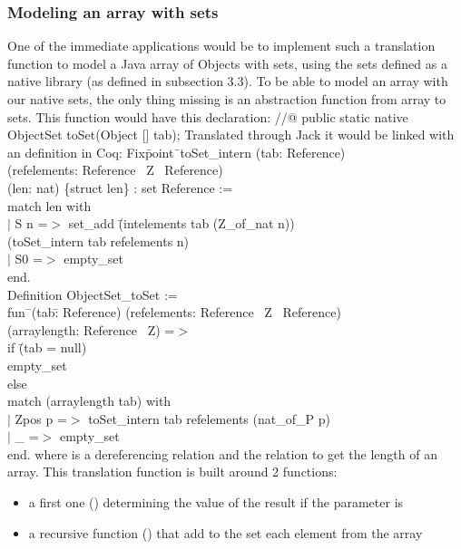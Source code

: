 \subsubsection{Modeling an array with sets}
One of the immediate applications would be to implement such a translation function to 
model a Java array of Objects with sets, using the sets defined as a native library 
(as defined in subsection 3.3).
To be able to model an array with our native sets, the only thing missing is
an abstraction function from array to sets. This function would have this declaration:
\btab
//@ public static native ObjectSet toSet(Object [] tab);
\etab
Translated through Jack it would be linked with an  definition in Coq:
\btab
Fix\=point\= \ toSet\_intern (tab: Reference)\\ 
\>(refelements: Reference \rarrow \ Z  \rarrow \ Reference)\+\\
\>(len: nat) \{struct len\} : set Reference :=\\
match len with\\
$|$ S n =$>$ set\_add \=(intelements tab (Z\_of\_nat n)) \\\>(toSet\_intern tab refelements n)\\
$|$ S0 =$>$ empty\_set\\
end.\-\\
Definition ObjectSet\_toSet :=\+\\ 
fun\= \ (tab\=: Reference) 
(refelements: Reference \rarrow \ Z  \rarrow \ Reference) \+\\ \>
(arraylength: Reference \rarrow \ Z) =$>$ \\
if \=(tab = null)\\
 \> empty\_set\\
  else \+\\
match (arraylength tab) with\\
$|$ Zpos p =$>$ toSet\_intern tab refelements (nat\_of\_P p)\\
$|$ \_ =$>$ empty\_set\\
end.
\etab
where  is a dereferencing relation and  the relation to get the length of an array. This translation function is built around 2 functions:
\begin{itemize}
\item a first one () determining the value of the result if the  parameter is  
\item a recursive function () that add to the set each element from the array
\end{itemize}

